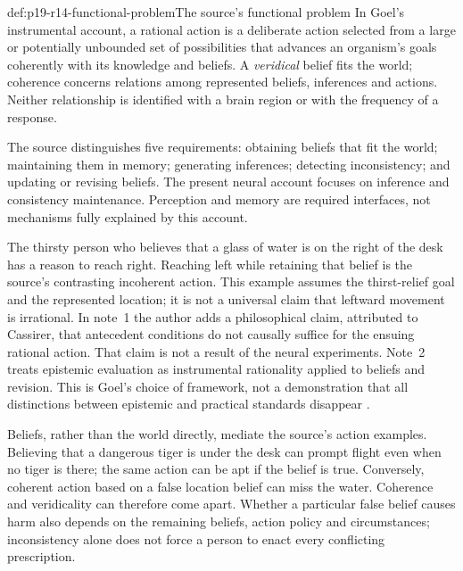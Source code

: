 \begin{hbdefinition}{def:p19-r14-functional-problem}{The source's functional problem}
In Goel's instrumental account, a rational action is a deliberate action
selected from a large or potentially unbounded set of possibilities that advances an organism's
goals coherently with its knowledge and beliefs. A \emph{veridical} belief
fits the world; coherence concerns relations among represented beliefs,
inferences and actions. Neither relationship is identified with a brain
region or with the frequency of a response.

The source distinguishes five requirements: obtaining beliefs that fit the
world; maintaining them in memory; generating inferences; detecting
inconsistency; and updating or revising beliefs. The present neural account
focuses on inference and consistency maintenance. Perception and memory
are required interfaces, not mechanisms fully explained by this account.
\end{hbdefinition}

The thirsty person who believes that a glass of water is on the right of
the desk has a reason to reach right. Reaching left while retaining that
belief is the source's contrasting incoherent action. This example assumes
the thirst-relief goal and the represented location; it is not a universal
claim that leftward movement is irrational. In note~1 the author adds a
philosophical claim, attributed to Cassirer, that antecedent conditions do
not causally suffice for the ensuing rational action. That claim is not a
result of the neural experiments. Note~2 treats epistemic evaluation as
instrumental rationality applied to beliefs and revision. This is Goel's
choice of framework, not a demonstration that all distinctions between
epistemic and practical standards disappear
\cite[pp.~115--116, 124, notes~1--2]{Goel2021RationalityBrain}.

Beliefs, rather than the world directly, mediate the source's action
examples. Believing that a dangerous tiger is under the desk can prompt
flight even when no tiger is there; the same action can be apt if the
belief is true. Conversely, coherent action based on a false location
belief can miss the water. Coherence and veridicality can therefore come
apart. Whether a particular false belief causes harm also depends on the
remaining beliefs, action policy and circumstances; inconsistency alone
does not force a person to enact every conflicting prescription.

